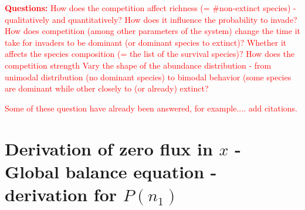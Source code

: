 \documentclass[%
 amsmath,amssymb,
 reprint,%
]{revtex4-2}
\begin{document}
\begin{widetext}
\textcolor{red}{{\bf Questions:}
How does the competition affect richness (= \#non-extinct species) - qualitatively and quantitatively? How does it influence the probability to invade? How does competition (among other parameters of the system) change the time it take for invaders to be dominant (or dominant species to extinct)?  Whether it affects the species composition (= the list of the survival species)? How does the competition strength Vary the shape of the abundance distribution - from unimodal distribution (no dominant species) to bimodal behavior (some species are dominant while other closely to (or already) extinct?      }

\textcolor{red}{Some of these question have already been answered, for example.... add citations. }






\section{Derivation of zero flux in $x$ - Global balance equation - derivation for $P(n_1)$}
\label{App:ZeroFlux}



\end{widetext}
\end{document}
